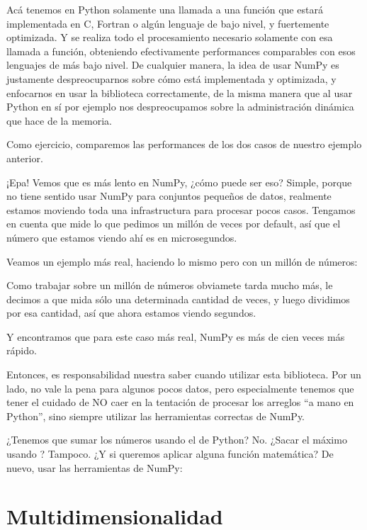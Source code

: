 Acá tenemos en Python solamente una llamada a una función que estará implementada en C, Fortran o algún lenguaje de bajo nivel, y fuertemente optimizada. Y se realiza todo el procesamiento necesario solamente con esa llamada a función, obteniendo efectivamente performances comparables con esos lenguajes de más bajo nivel. De cualquier manera, la idea de usar NumPy es justamente despreocuparnos sobre cómo está implementada y optimizada, y enfocarnos en usar la biblioteca correctamente, de la misma manera que al usar Python en sí por ejemplo nos despreocupamos sobre la administración dinámica que hace de la memoria.

Como ejercicio, comparemos las performances de los dos casos de nuestro ejemplo anterior.


¡Epa! Vemos que es más lento en NumPy, ¿cómo puede ser eso? Simple, porque no tiene sentido usar NumPy para conjuntos pequeños de datos, realmente estamos moviendo toda una infrastructura para procesar pocos casos. Tengamos en cuenta que  mide lo que pedimos un millón de veces por default, así que el número que estamos viendo ahí es en microsegundos.

Veamos un ejemplo más real, haciendo lo mismo pero con un millón de números:


Como trabajar sobre un millón de números obviamete tarda mucho más, le decimos a  que mida sólo una determinada cantidad de veces, y luego dividimos por esa cantidad, así que ahora estamos viendo segundos.

Y encontramos que para este caso más real, NumPy es más de cien veces más rápido.

Entonces, es responsabilidad nuestra saber cuando utilizar esta biblioteca. Por un lado, no vale la pena para algunos pocos datos, pero especialmente tenemos que tener el cuidado de NO caer en la tentación de procesar los arreglos ``a mano en Python'', sino siempre utilizar las herramientas correctas de NumPy.

¿Tenemos que sumar los números usando el  de Python? No. ¿Sacar el máximo usando ? Tampoco. ¿Y si queremos aplicar alguna función matemática? De nuevo, usar las herramientas de NumPy:



\section{Multidimensionalidad}

